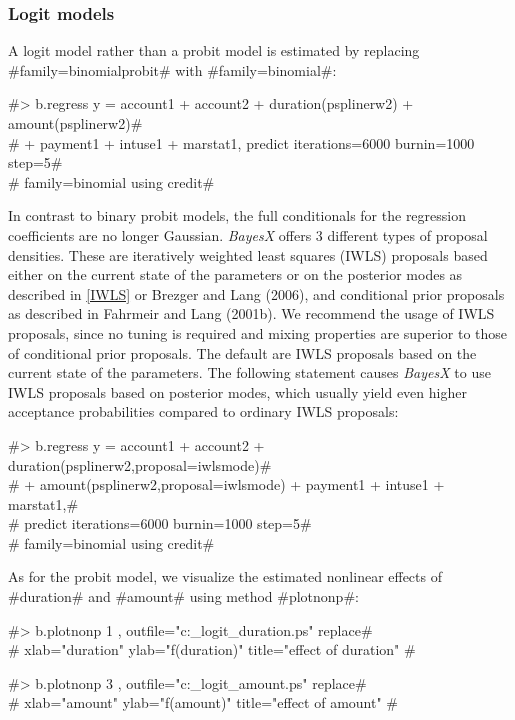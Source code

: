 \clearpage

\subsubsection{Logit models}

A logit model rather than a probit model is estimated by replacing
#family=binomialprobit# with #family=binomial#:

#> b.regress  y = account1 + account2 + duration(psplinerw2) + amount(psplinerw2)# \\
#  + payment1 + intuse1 + marstat1, predict iterations=6000 burnin=1000 step=5# \\
#  family=binomial using credit#

In contrast to binary probit models, the full conditionals for the
regression coefficients are no longer Gaussian. {\em BayesX} offers
3 different types of proposal densities. These are iteratively
weighted least squares (IWLS) proposals based either on the current
state of the parameters or on the posterior modes as described in
\autoref{IWLS} or Brezger and Lang (2006), and conditional prior
proposals as described in Fahrmeir and Lang (2001b). We recommend
the usage of IWLS proposals, since no tuning is required and mixing
properties are superior to those of conditional prior proposals. The
default are IWLS proposals based on the current state of the
parameters. The following statement causes {\em BayesX} to use IWLS
proposals based on posterior modes, which usually yield even higher
acceptance probabilities compared to ordinary IWLS proposals:

#> b.regress  y = account1 + account2 + duration(psplinerw2,proposal=iwlsmode)# \\
#  + amount(psplinerw2,proposal=iwlsmode) + payment1 + intuse1 + marstat1,# \\
#  predict iterations=6000 burnin=1000 step=5# \\
#  family=binomial using credit#

As for the probit model, we visualize the estimated nonlinear
effects of #duration# and #amount# using method #plotnonp#:

#> b.plotnonp 1 , outfile="c:\results\credit_logit_duration.ps" replace# \\
#  xlab="duration" ylab="f(duration)" title="effect of duration" #

#> b.plotnonp 3 , outfile="c:\results\credit_logit_amount.ps" replace# \\
#  xlab="amount" ylab="f(amount)" title="effect of amount" #

